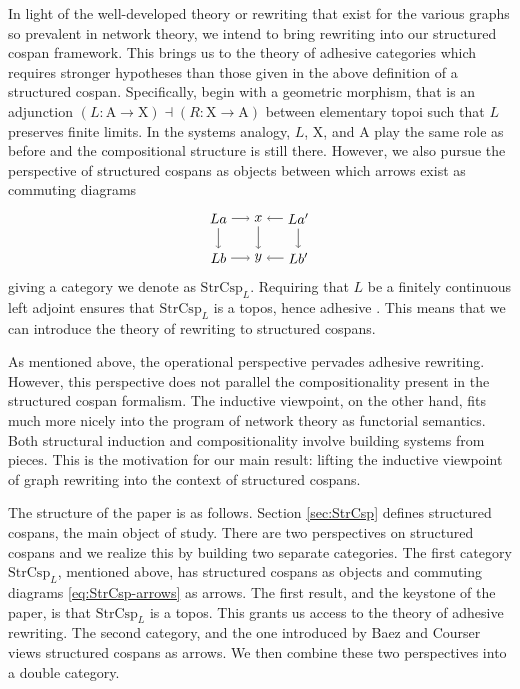 \documentclass{amsart}
\newcommand{\A}{\cat{A}}
\newcommand{\X}{\cat{X}}
\newcommand{\StrCsp}{\cat{StrCsp}}
\newcommand{\cat}[1]{\mathrm{#1}}
\newcommand{\from}{\colon}
\theoremstyle{remark}
\theoremstyle{definition}
\begin{document}
In light of the well-developed theory or rewriting that exist for the
various graphs so prevalent in network theory, we intend to bring
rewriting into our structured cospan framework.  This brings us to the
theory of adhesive categories which requires stronger hypotheses
than those given in the above definition of a structured
cospan. Specifically, begin with a geometric morphism, that is an
adjunction $ ( L \from \A \to \X ) \dashv ( R \from \X \to \A ) $
between elementary topoi such that $ L $ preserves finite limits. In
the systems analogy, $ L $, $ \X $, and $ \A $ play the same role as
before and the compositional structure is still there.  However, we
also pursue the perspective of structured cospans as objects between
which arrows exist as commuting diagrams
%
\begin{equation} \label{eq:StrCsp-arrows}
  \begin{tikzpicture}
    \node (1t) at (0,1) {$ La $};
    \node (2t) at (1,1) {$ x $};
    \node (3t) at (2,1) {$ La' $};
    \node (1b) at (0,0) {$ Lb $};
    \node (2b) at (1,0) {$ y $};
    \node (3b) at (2,0) {$ Lb' $};
    \draw [->] (1t) to node [] {\scriptsize{$  $}} (2t);
    \draw [->] (3t) to node [] {\scriptsize{$  $}} (2t);
    \draw [->] (1b) to node [] {\scriptsize{$  $}} (2b);
    \draw [->] (3b) to node [] {\scriptsize{$  $}} (2b);
    \draw [->] (1t) to node [] {\scriptsize{$  $}} (1b);
    \draw [->] (2t) to node [] {\scriptsize{$  $}} (2b);
    \draw [->] (3t) to node [] {\scriptsize{$  $}} (3b);
  \end{tikzpicture}
\end{equation}
%
giving a category we denote as $ \StrCsp_L $.  Requiring that $ L $ be
a finitely continuous left adjoint ensures that $ \StrCsp_L $ is a
topos, hence adhesive \cite{LackSobo_ToposIsAdh}. This means that we
can introduce the theory of rewriting to structured cospans.

As mentioned above, the operational perspective pervades adhesive
rewriting. However, this perspective does not parallel the
compositionality present in the structured cospan formalism. The
inductive viewpoint, on the other hand, fits much more nicely into the
program of network theory as functorial semantics. Both structural
induction and compositionality involve building systems from
pieces. This is the motivation for our main result: lifting the
inductive viewpoint of graph rewriting into the context of structured
cospans.

The structure of the paper is as follows.  Section \ref{sec:StrCsp}
defines structured cospans, the main object of study. There are two
perspectives on structured cospans and we realize this by building two
separate categories.  The first category $ \StrCsp_L $, mentioned
above, has structured cospans as objects and commuting diagrams
\eqref{eq:StrCsp-arrows} as arrows. The first result, and the keystone
of the paper, is that $ \StrCsp_L $ is a topos.  This grants us access
to the theory of adhesive rewriting.  The second category, and the one
introduced by Baez and Courser \cite{StrCsp} views structured cospans
as arrows.  We then combine these two perspectives into a double
category.
\end{document}
